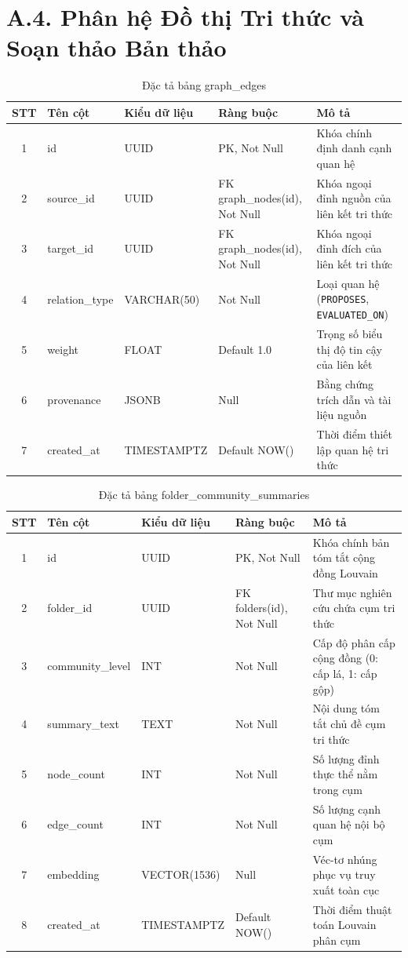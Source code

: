 \section*{A.4. Phân hệ Đồ thị Tri thức và Soạn thảo Bản thảo}

\begin{table}[H]
\centering
\singlespacing
\fontsize{9pt}{11.5pt}\selectfont
\caption{Đặc tả bảng graph\_edges}
\label{tab:app_graph_edges}
\renewcommand{\arraystretch}{0.65}
\begin{tabularx}{\textwidth}{|c|>{\raggedright\arraybackslash}p{3.2cm}|>{\raggedright\arraybackslash}p{2.6cm}|>{\raggedright\arraybackslash}p{3.0cm}|>{\raggedright\arraybackslash}X|}
\hline
\textbf{STT} & \centering\textbf{Tên cột} & \centering\textbf{Kiểu dữ liệu} & \centering\textbf{Ràng buộc} & \centering\textbf{Mô tả} \tabularnewline \hline
1 & id & UUID & PK, Not Null & Khóa chính định danh cạnh quan hệ \tabularnewline \hline
2 & source\_id & UUID & FK graph\_\allowbreak nodes(id), Not Null & Khóa ngoại đỉnh nguồn của liên kết tri thức \tabularnewline \hline
3 & target\_id & UUID & FK graph\_\allowbreak nodes(id), Not Null & Khóa ngoại đỉnh đích của liên kết tri thức \tabularnewline \hline
4 & relation\_type & VARCHAR(50) & Not Null & Loại quan hệ (\texttt{PROPOSES}, \texttt{EVALUATED\_ON}) \tabularnewline \hline
5 & weight & FLOAT & Default 1.0 & Trọng số biểu thị độ tin cậy của liên kết \tabularnewline \hline
6 & provenance & JSONB & Null & Bằng chứng trích dẫn và tài liệu nguồn \tabularnewline \hline
7 & created\_at & TIMESTAMPTZ & Default NOW() & Thời điểm thiết lập quan hệ tri thức \tabularnewline \hline
\end{tabularx}
\end{table}

\begin{table}[H]
\centering
\singlespacing
\fontsize{9pt}{11.5pt}\selectfont
\caption{Đặc tả bảng folder\_community\_summaries}
\label{tab:app_community_summaries}
\renewcommand{\arraystretch}{0.65}
\begin{tabularx}{\textwidth}{|c|>{\raggedright\arraybackslash}p{3.2cm}|>{\raggedright\arraybackslash}p{2.6cm}|>{\raggedright\arraybackslash}p{3.0cm}|>{\raggedright\arraybackslash}X|}
\hline
\textbf{STT} & \centering\textbf{Tên cột} & \centering\textbf{Kiểu dữ liệu} & \centering\textbf{Ràng buộc} & \centering\textbf{Mô tả} \tabularnewline \hline
1 & id & UUID & PK, Not Null & Khóa chính bản tóm tắt cộng đồng Louvain \tabularnewline \hline
2 & folder\_id & UUID & FK folders(id), Not Null & Thư mục nghiên cứu chứa cụm tri thức \tabularnewline \hline
3 & community\_level & INT & Not Null & Cấp độ phân cấp cộng đồng (0: cấp lá, 1: cấp gộp) \tabularnewline \hline
4 & summary\_text & TEXT & Not Null & Nội dung tóm tắt chủ đề cụm tri thức \tabularnewline \hline
5 & node\_count & INT & Not Null & Số lượng đỉnh thực thể nằm trong cụm \tabularnewline \hline
6 & edge\_count & INT & Not Null & Số lượng cạnh quan hệ nội bộ cụm \tabularnewline \hline
7 & embedding & VECTOR(1536) & Null & Véc-tơ nhúng phục vụ truy xuất toàn cục \tabularnewline \hline
8 & created\_at & TIMESTAMPTZ & Default NOW() & Thời điểm thuật toán Louvain phân cụm \tabularnewline \hline
\end{tabularx}
\end{table}

